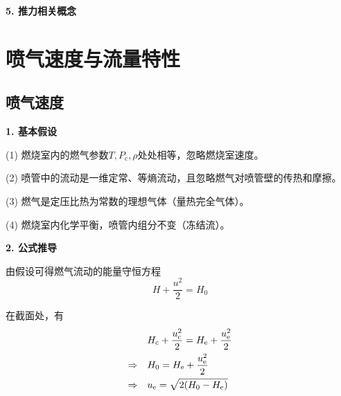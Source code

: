 \noindent \textbf{5. 推力相关概念}




\section{喷气速度与流量特性}
\subsection{喷气速度}

\noindent \textbf{1. 基本假设}

(1) \hspace*{0.5em}燃烧室内的燃气参数$T,P_\text{c}, \rho$处处相等，忽略燃烧室速度。

(2) \hspace*{0.5em}喷管中的流动是一维定常、等熵流动，且忽略燃气对喷管壁的传热和摩擦。

(3) \hspace*{0.5em}燃气是定压比热为常数的理想气体（量热完全气体）。

(4) \hspace*{0.5em}燃烧室内化学平衡，喷管内组分不变（冻结流）。
\vspace*{1em}

\noindent \textbf{2. 公式推导}

由假设可得燃气流动的能量守恒方程
\begin{equation}
	H + \dfrac{u^2}{2} = H_0
\end{equation}

在截面处，有
\begin{align*}
	&H_{\text{c}} + \dfrac{u_{\text{c}}^2}{2} = H_{\rm{e}} + \dfrac{u_{\rm{e}}^2}{2}\\
	\Rightarrow \quad& H_0 = H_{\rm{e}} + \dfrac{u_{\rm{e}}^2}{2}\\
	\Rightarrow \quad& u_{\rm{e}} = \sqrt{2(H_0 - H_{\rm{e}})}
\end{align*}


